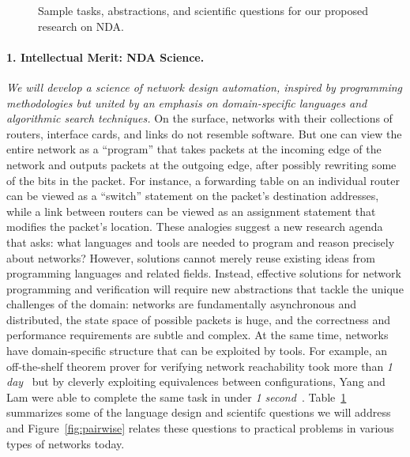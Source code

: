 \begin{figure}[t]
\centerline{}
\caption{Sample tasks, abstractions, and scientific questions for our
  proposed research on NDA.}
\vspace{2mm}
\label{scientificquestions}
\end{figure}


\paragraph*{1. Intellectual Merit: NDA Science.} {\em We will develop a science of network design automation, inspired by programming methodologies but united by an emphasis on domain-specific languages and algorithmic search techniques.}
%
On the surface, networks with their collections of routers, interface cards, and links do not resemble software. But one can view the entire network as a ``program'' that takes packets at the incoming edge of the network and outputs packets at the outgoing edge, after possibly rewriting some of the bits in the packet. For instance, a forwarding table on an individual router can be viewed as a ``switch'' statement on the packet's destination addresses, while a link between routers can be viewed as an assignment statement that modifies the packet's location. These analogies suggest a new research agenda that asks: what languages and tools are needed to program and reason precisely about networks?  
However, solutions cannot merely reuse existing ideas from programming languages and related fields. Instead, effective solutions for network programming and verification will require new abstractions that tackle the unique challenges of the domain: networks are fundamentally asynchronous and distributed, the state space of possible packets is huge, and the correctness and performance requirements are subtle and complex. At the same time, networks have domain-specific structure that can be exploited by tools. For example, an off-the-shelf theorem prover for verifying network reachability took more than {\em 1 day}~\cite{nod} but by cleverly exploiting equivalences between configurations, Yang and Lam were able to complete the same task in under {\em 1 second}~\cite{lam}.
Table~\ref{scientificquestions} summarizes some of the language design and scientifc questions we will address and Figure~\ref{fig:pairwise} relates these questions to practical problems in various types of networks today.

